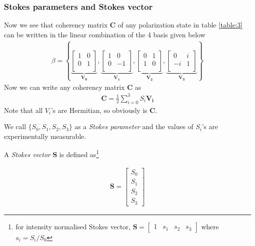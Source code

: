 \documentclass[11pt,a4paper]{article}
\numberwithin{equation}{section}
\begin{document}
\subsubsection{Stokes parameters and Stokes vector}
Now we see that coherency matrix \textbf{C} of any polarization state in table \ref{table:3} can be written in the linear combination of the 4 basis given below
\begin{align}
	\beta = \left\{
	\underbrace{\begin{bmatrix}1 & 0 \\ 0 & 1\\\end{bmatrix}}_{\boldsymbol{V_0}},
	\underbrace{\begin{bmatrix}1 & 0 \\ 0 & -1\\\end{bmatrix}}_{\boldsymbol{V_1}},
	\underbrace{\begin{bmatrix}0 & 1 \\ 1 & 0\\\end{bmatrix}}_{\boldsymbol{V_2}},
	\underbrace{\begin{bmatrix}0 & i \\ -i & 1\\\end{bmatrix}}_{\boldsymbol{V_3}}
	\right\}
\end{align}
Now we can write any coherency matrix \textbf{C} as 
\begin{align}
\textbf{C} = \frac{1}{2} \sum_{i=0}^{3} S_i \boldsymbol{V_i} \label{eq:1.12}
\end{align}
Note that all $V_i$'s are Hermitian, so obviously is \textbf{C}.

We call $\{S_0, S_1, S_2, S_3\}$ as a \textit{Stokes parameter} and the values of $S_i$'s are experimentally measurable.

A \textit{Stokes vector} \textbf{S} is defined as\footnote{for intensity normalised Stokes vector, $\textbf{S}= \begin{bmatrix} 1& s_1& s_2& s_3\end{bmatrix}$ where $s_i=S_i/S_0$}

\begin{align}
	\textbf{S}= \begin{bmatrix} S_0\\ S_1\\ S_2\\S_3	\end{bmatrix}
\end{align}
\end{document}
